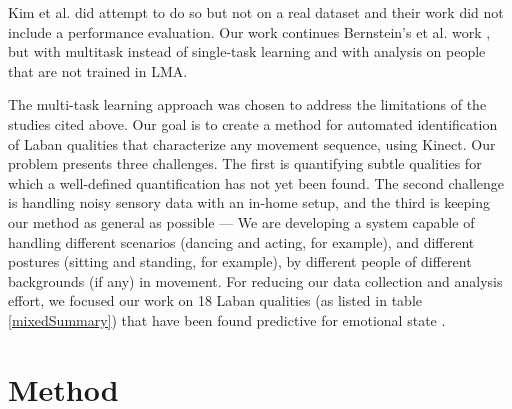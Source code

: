 \documentclass{sigchi}
\begin{document}
Kim et al. \cite{kim} did attempt to do so but not on a real dataset and their
work did not include a performance evaluation. Our work continues Bernstein's et al. work \cite{ran}, but with multitask instead of single-task learning and with analysis on people that are not trained in LMA.
\mbox{}\\
\par
The multi-task learning approach was chosen to address the limitations of the studies cited above. Our goal is to create a method for automated identification of Laban qualities that
characterize any movement sequence, using Kinect.
Our problem presents three challenges. The first is
quantifying subtle qualities for which a well-defined quantification has not yet been found.
The second challenge is handling noisy sensory data with an in-home setup, and the
third is keeping our method as general as possible --- We are developing a system capable of
handling different scenarios (dancing and acting, for example), and different postures (sitting and standing, for example), by different people of different backgrounds (if any)
in movement. For reducing our data collection and analysis effort, we focused our work on 18 Laban qualities
(as listed in table \ref{mixedSummary}) that have been found predictive for emotional state \cite{Tsachor}.

\section{Method}
\end{document}
